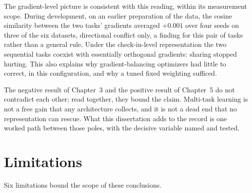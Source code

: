 The gradient-level picture is consistent with this reading, within its measurement
scope. During development, on an earlier preparation of the data, the cosine
similarity between the two tasks' gradients averaged $+0.001$ over four seeds on
three of the six datasets, directional conflict only, a finding for this pair of
tasks rather than a general rule. Under the check-in-level representation the two
sequential tasks coexist with essentially orthogonal gradients: sharing stopped
hurting. This also explains why gradient-balancing optimizers had little to correct,
in this configuration, and why a tuned fixed weighting sufficed.

The negative result of Chapter~3 and the positive result of Chapter~5 do not
contradict each other; read together, they bound the claim. Multi-task learning is
not a free gain that any architecture collects, and it is not a dead end that no
representation can rescue. What this dissertation adds to the record is one worked
path between those poles, with the decisive variable named and tested.

\section{Limitations}
\label{sec:conc:limitations}

Six limitations bound the scope of these conclusions.

